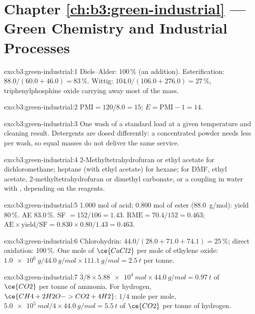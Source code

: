 \section*{Chapter \ref{ch:b3:green-industrial} --- Green Chemistry and Industrial Processes}

\begin{solution}{exo:b3:green-industrial:1}
Diels--Alder: 100\,\% (an addition). Esterification: $88.0/(60.0 + 46.0) = 83$\,\%. Wittig:
$104.0/(106.0 + 276.0) = 27$\,\%, triphenylphosphine oxide carrying away most of the mass.
\end{solution}

\begin{solution}{exo:b3:green-industrial:2}
$\mathrm{PMI} = 120/8.0 = 15$; $E = \mathrm{PMI} - 1 = 14$.
\end{solution}

\begin{solution}{exo:b3:green-industrial:3}
One wash of a standard load at a given temperature and cleaning result. Detergents
are dosed differently: a concentrated powder needs less per wash, so equal masses
do not deliver the same service.
\end{solution}

\begin{solution}{exo:b3:green-industrial:4}
2-Methyltetrahydrofuran or ethyl acetate for dichloromethane; heptane (with ethyl
acetate) for hexane; for DMF, ethyl acetate, 2-methyltetrahydrofuran or
dimethyl carbonate, or a coupling in water with , depending on the
reagents.
\end{solution}

\begin{solution}{exo:b3:green-industrial:5}
1.000 mol of acid; 0.800 mol of ester (\qty{88.0}{g/mol}): yield 80\,\%. AE 83.0\,\%. SF $= 152/106 = 1.43$.
$\mathrm{RME} = 70.4/152 = 0.463$; $\mathrm{AE} \times \text{yield}/\mathrm{SF} = 0.830 \times 0.80/1.43 = 0.463$.
\end{solution}

\begin{solution}{exo:b3:green-industrial:6}
Chlorohydrin: $44.0/(28.0 + 71.0 + 74.1) = 25$\,\%; direct oxidation: 100\,\%. One mole of $\ce{CaCl2}$ per mole of
ethylene oxide: $\qty{1.0e6}{g}/\qty{44.0}{g/mol} \times \qty{111.1}{g/mol} = \qty{2.5}{t}$ per tonne.
\end{solution}

\begin{solution}{exo:b3:green-industrial:7}
$3/8 \times \qty{5.88e4}{mol} \times \qty{44.0}{g/mol} = \qty{0.97}{t}$ of $\ce{CO2}$ per tonne of ammonia. For hydrogen, $\ce{CH4 + 2H2O -> CO2 + 4H2}$:
$1/4$ mole per mole, $\qty{5.0e5}{mol}/4 \times \qty{44.0}{g/mol} = \qty{5.5}{t}$ of $\ce{CO2}$ per tonne of hydrogen.
\end{solution}

